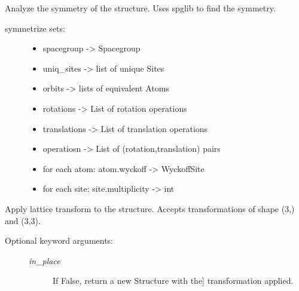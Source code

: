 \documentclass[letterpaper,10pt,english]{sphinxmanual}
\begin{document}
\begin{fulllineitems}

\begin{fulllineitems}
\label{models:qmpy.Structure.symmetrize}
Analyze the symmetry of the structure. Uses spglib to find the
symmetry.
\begin{description}
\item[{symmetrize sets:}] \leavevmode\begin{itemize}
\item {} 
spacegroup -\textgreater{} Spacegroup

\item {} 
uniq\_sites -\textgreater{} list of unique Sites

\item {} 
orbits -\textgreater{} lists of equivalent Atoms

\item {} 
rotations -\textgreater{} List of rotation operations

\item {} 
translations -\textgreater{} List of translation operations

\item {} 
operatiosn -\textgreater{} List of (rotation,translation) pairs

\item {} 
for each atom: atom.wyckoff -\textgreater{} WyckoffSite

\item {} 
for each site: site.multiplicity -\textgreater{} int

\end{itemize}

\end{description}

\end{fulllineitems}


\begin{fulllineitems}
\label{models:qmpy.Structure.t}
Apply lattice transform to the structure. Accepts transformations of
shape (3,) and (3,3).
\begin{description}
\item[{Optional keyword arguments:}] \leavevmode\begin{description}
\item[{\emph{in\_place}}] \leavevmode{[}If False, return a new Structure with the{]}
transformation applied.


\end{description}
\end{description}
\end{fulllineitems}
\end{fulllineitems}
\end{document}
